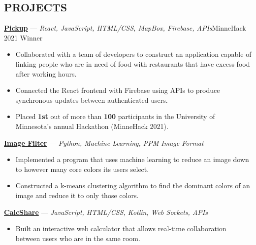 \documentclass[11pt]{res}
\begin{document}
\begin{footnotesize}
\begin{resume}
\begin{small}
\section{PROJECTS}
\end{small} 
\vspace{.5mm}
\href{https://devpost.com/software/pickup-7b8yhx}{\textbf{Pickup}} — {\sl React, JavaScript, HTML/CSS, MapBox, Firebase, APIs}\hfill MinneHack 2021 Winner\vspace{-4.5mm}
\begin{itemize}[leftmargin=6.25mm] \itemsep -2pt 
\item Collaborated with a team of developers to construct an application capable of linking people who are in need of food with restaurants that have excess food after working hours.
\vspace{1.30mm}
\item Connected the React frontend with Firebase using APIs to produce synchronous updates between authenticated users.
\vspace{1.30mm}
\item Placed \textbf{1st} out of more than \textbf{100} participants in the University of Minnesota's annual Hackathon (MinneHack 2021). 
\end{itemize}
\vspace{-2.5mm}
\href{https://github.com/CharlesShi12/ImageFilters}{\textbf{Image Filter}} — {\sl Python, Machine Learning, PPM Image Format} \vspace{-4.5mm}
\begin{itemize}[leftmargin=6.25mm] \itemsep -2pt 
\item Implemented a program that uses machine learning to reduce an image down to however many core colors its users select.
\vspace{1.30mm}
\item Constructed a k-means clustering algorithm to find the dominant colors of an image and reduce it to only those colors. 
\end{itemize}
\vspace{-2.5mm}
\href{https://github.com/CharlesShi12/CalcShare}{\textbf{CalcShare}} — {\sl JavaScript, HTML/CSS, Kotlin, Web Sockets, APIs} \vspace{-4.5mm}
\begin{itemize}[leftmargin=6.25mm] \itemsep -2pt 
\item Built an interactive web calculator that allows real-time collaboration between users who are in the same room. 
\vspace{1.30mm}

\end{itemize}
\end{resume}
\end{footnotesize}
\end{document}
